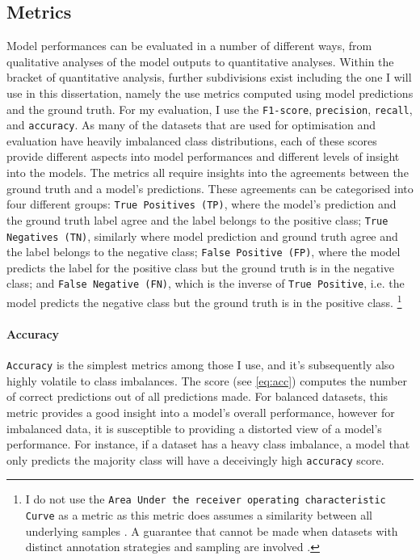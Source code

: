 \subsection{Metrics}

Model performances can be evaluated in a number of different ways, from qualitative analyses of the model outputs to quantitative analyses. 
Within the bracket of quantitative analysis, further subdivisions exist including the one I will use in this dissertation, namely the use metrics computed using model predictions and the ground truth.
For my evaluation, I use the \texttt{F1-score}, \texttt{precision}, \texttt{recall}, and \texttt{accuracy}. 
As many of the datasets that are used for optimisation and evaluation have heavily imbalanced class distributions, each of these scores provide different aspects into model performances and different levels of insight into the models.
The metrics all require insights into the agreements between the ground truth and a model's predictions. 
These agreements can be categorised into four different groups:
\texttt{True Positives (TP)}, where the model's prediction and the ground truth label agree and the label belongs to the positive class; \texttt{True Negatives (TN)}, similarly where model prediction and ground truth agree and the label belongs to the negative class; \texttt{False Positive (FP)}, where the model predicts the label for the positive class but the ground truth is in the negative class; and \texttt{False Negative (FN)}, which is the inverse of \texttt{True Positive}, i.e. the model predicts the negative class but the ground truth is in the positive class.
\footnote{I do not use the \texttt{Area Under the receiver operating characteristic Curve} as a metric as this metric does assumes a similarity between all underlying samples \citep{Stevenson:2021}. A guarantee that cannot be made when datasets with distinct annotation strategies and sampling are involved .}

\paragraph{Accuracy}
\texttt{Accuracy} is the simplest metrics among those I use, and it's subsequently also highly volatile to class imbalances.
The score (see \cref{eq:acc}) computes the number of correct predictions out of all predictions made. 
For balanced datasets, this metric provides a good insight into a model's overall performance, however for imbalanced data, it is susceptible to providing a distorted view of a model's performance. 
For instance, if a dataset has a heavy class imbalance, a model that only predicts the majority class will have a deceivingly high \texttt{accuracy} score.

